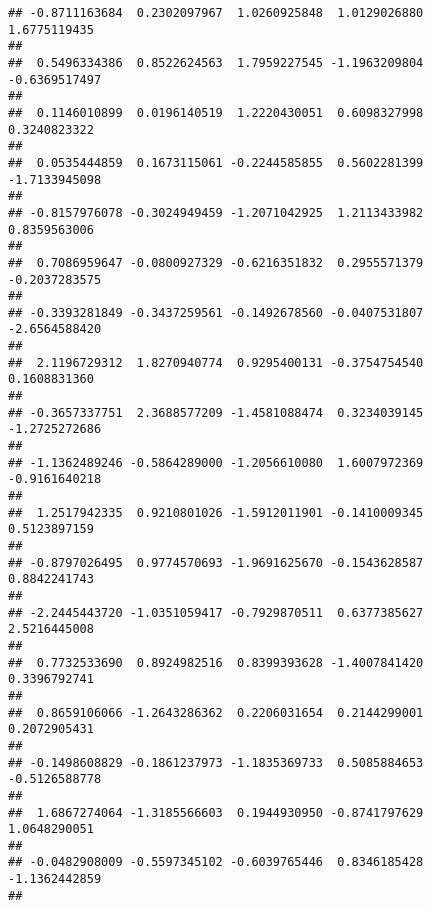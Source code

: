 \documentclass[]{article}
\begin{document}
\begin{verbatim}
## -0.8711163684  0.2302097967  1.0260925848  1.0129026880  1.6775119435 
##                                                                       
##  0.5496334386  0.8522624563  1.7959227545 -1.1963209804 -0.6369517497 
##                                                                       
##  0.1146010899  0.0196140519  1.2220430051  0.6098327998  0.3240823322 
##                                                                       
##  0.0535444859  0.1673115061 -0.2244585855  0.5602281399 -1.7133945098 
##                                                                       
## -0.8157976078 -0.3024949459 -1.2071042925  1.2113433982  0.8359563006 
##                                                                       
##  0.7086959647 -0.0800927329 -0.6216351832  0.2955571379 -0.2037283575 
##                                                                       
## -0.3393281849 -0.3437259561 -0.1492678560 -0.0407531807 -2.6564588420 
##                                                                       
##  2.1196729312  1.8270940774  0.9295400131 -0.3754754540  0.1608831360 
##                                                                       
## -0.3657337751  2.3688577209 -1.4581088474  0.3234039145 -1.2725272686 
##                                                                       
## -1.1362489246 -0.5864289000 -1.2056610080  1.6007972369 -0.9161640218 
##                                                                       
##  1.2517942335  0.9210801026 -1.5912011901 -0.1410009345  0.5123897159 
##                                                                       
## -0.8797026495  0.9774570693 -1.9691625670 -0.1543628587  0.8842241743 
##                                                                       
## -2.2445443720 -1.0351059417 -0.7929870511  0.6377385627  2.5216445008 
##                                                                       
##  0.7732533690  0.8924982516  0.8399393628 -1.4007841420  0.3396792741 
##                                                                       
##  0.8659106066 -1.2643286362  0.2206031654  0.2144299001  0.2072905431 
##                                                                       
## -0.1498608829 -0.1861237973 -1.1835369733  0.5085884653 -0.5126588778 
##                                                                       
##  1.6867274064 -1.3185566603  0.1944930950 -0.8741797629  1.0648290051 
##                                                                       
## -0.0482908009 -0.5597345102 -0.6039765446  0.8346185428 -1.1362442859 
##                                                                       

\end{verbatim}
\end{document}
